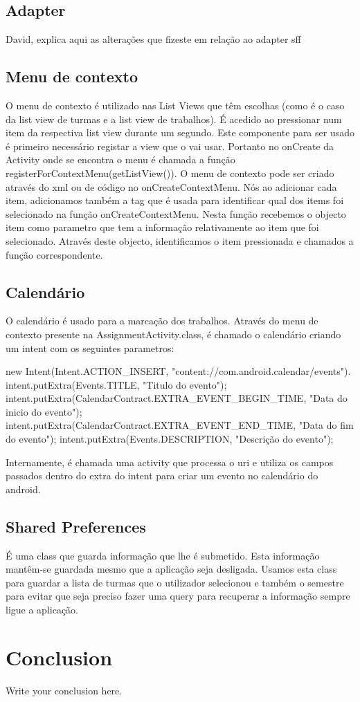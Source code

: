 \documentclass{article}
\begin{document}
\subsection{Adapter}

David, explica aqui as alterações que fizeste em relação ao adapter sff

\subsection{Menu de contexto}
O menu de contexto é utilizado nas List Views que têm escolhas (como é o caso da list view de turmas e a list view de trabalhos). É acedido ao pressionar num item da respectiva list view durante um segundo.
Este componente para ser usado é primeiro necessário registar a view que o vai usar. Portanto no onCreate da Activity onde se encontra o menu é chamada a função registerForContextMenu(getListView()).
O menu de contexto pode ser criado através do xml ou de código no onCreateContextMenu. Nós ao adicionar cada item, adicionamos também a tag que é usada para identificar qual dos items foi selecionado na função
onCreateContextMenu. Nesta função recebemos o objecto item como parametro que tem a informação relativamente ao item que foi selecionado. Através deste objecto, identificamos o item pressionada e 
chamados a função correspondente.

\subsection{Calendário}
O calendário é usado para a marcação dos trabalhos. Através do menu de contexto presente na AssignmentActivity.class, é chamado o calendário criando um intent com os seguintes parametros:

new Intent(Intent.ACTION_INSERT, "content://com.android.calendar/events").
intent.putExtra(Events.TITLE, "Titulo do evento");
intent.putExtra(CalendarContract.EXTRA_EVENT_BEGIN_TIME, "Data do inicio do evento");
intent.putExtra(CalendarContract.EXTRA_EVENT_END_TIME, "Data do fim do evento");
intent.putExtra(Events.DESCRIPTION, "Descrição do evento");

Internamente, é chamada uma activity que processa o uri e utiliza os campos passados dentro do extra do intent para criar um evento no calendário do android.

\subsection{Shared Preferences}
É uma class que guarda informação que lhe é submetido. Esta informação mantêm-se guardada mesmo que a aplicação seja desligada. Usamos esta class para guardar  a lista de turmas que o utilizador selecionou
e também o semestre para evitar que seja preciso fazer uma query para recuperar a informação sempre ligue a aplicação.

\section{Conclusion}
Write your conclusion here.
\end{document}
